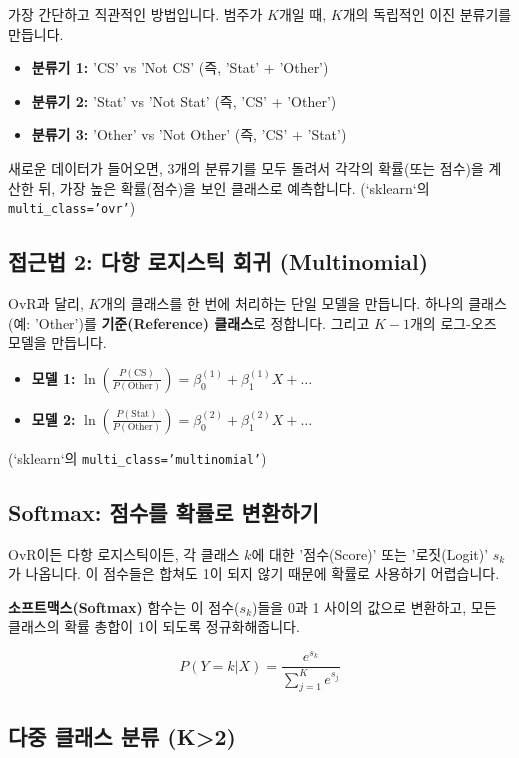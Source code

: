 \documentclass[11pt,a4paper]{book}
\theoremstyle{definition}
\begin{document}
가장 간단하고 직관적인 방법입니다. 범주가 $K$개일 때, $K$개의 독립적인 이진 분류기를 만듭니다.

\begin{itemize}
  \item \textbf{분류기 1:} 'CS' vs 'Not CS' (즉, 'Stat' + 'Other')
  \item \textbf{분류기 2:} 'Stat' vs 'Not Stat' (즉, 'CS' + 'Other')
  \item \textbf{분류기 3:} 'Other' vs 'Not Other' (즉, 'CS' + 'Stat')
\end{itemize}

새로운 데이터가 들어오면, 3개의 분류기를 모두 돌려서 각각의 확률(또는 점수)을 계산한 뒤, 가장 높은 확률(점수)을 보인 클래스로 예측합니다. (`sklearn`의 \texttt{multi\_class='ovr'})

\subsection{접근법 2: 다항 로지스틱 회귀 (Multinomial)}

OvR과 달리, $K$개의 클래스를 한 번에 처리하는 단일 모델을 만듭니다.
하나의 클래스(예: 'Other')를 \textbf{기준(Reference) 클래스}로 정합니다.
그리고 $K-1$개의 로그-오즈 모델을 만듭니다.

\begin{itemize}
  \item \textbf{모델 1:} $\ln\left(\frac{P(\text{CS})}{P(\text{Other})}\right) = \beta_0^{(1)} + \beta_1^{(1)} X + \dots$
  \item \textbf{모델 2:} $\ln\left(\frac{P(\text{Stat})}{P(\text{Other})}\right) = \beta_0^{(2)} + \beta_1^{(2)} X + \dots$
\end{itemize}
(`sklearn`의 \texttt{multi\_class='multinomial'})

\subsection{Softmax: 점수를 확률로 변환하기}

OvR이든 다항 로지스틱이든, 각 클래스 $k$에 대한 '점수(Score)' 또는 '로짓(Logit)' $s_k$가 나옵니다.
이 점수들은 합쳐도 1이 되지 않기 때문에 확률로 사용하기 어렵습니다.

\textbf{소프트맥스(Softmax)} 함수는 이 점수($s_k$)들을 0과 1 사이의 값으로 변환하고,
모든 클래스의 확률 총합이 1이 되도록 정규화해줍니다.

$$ P(Y=k|X) = \frac{e^{s_k}}{\sum_{j=1}^{K} e^{s_j}} $$

\subsection{다중 클래스 분류 (K>2)}
\end{document}
